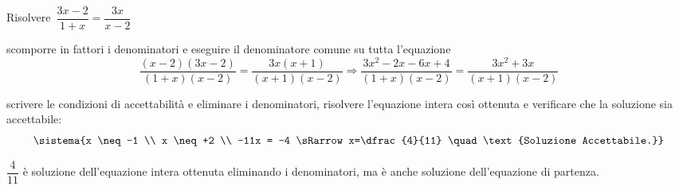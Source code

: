 % 
% 
% 

 \begin{esempio}
Risolvere~\(\dfrac{3x-2}{1+x}=\dfrac{3x}{x-2}\)
 
\begin{enumerate*}
\item scomporre in fattori i denominatori e eseguire il  denominatore comune 
su tutta l'equazione
\[\frac{(x-2)(3x-2)}{(1+x)(x-2)}=\frac{3x(x+1)}{(x+1)(x-2)}\Rightarrow
\frac{3x^{2}-2x-6x+4}{(1+x)(x-2)}=\frac{3x^2+3x}{(x+1)(x-2)}\]
\item scrivere le condizioni di accettabilità e eliminare i denominatori,
risolvere l'equazione intera così ottenuta e verificare che la soluzione sia 
accettabile:
\[\sistema{x \neq -1 \\ 
           x \neq +2 \\ 
           -11x = -4 \sRarrow x=\dfrac{4}{11} \quad 
             \text{Soluzione Accettabile.}}\]
\end{enumerate*}
\(\dfrac{4}{11}\) è soluzione dell'equazione intera ottenuta eliminando i 
denominatori, ma è anche soluzione dell'equazione di partenza.
 \end{esempio}


